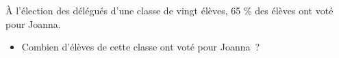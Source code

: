 \documentclass[exercice]{thedocument}%
\begin{document}
%
À l'élection des délégués d'une classe de vingt élèves, 65 \% des élèves
ont voté pour Joanna.
\begin{itemize}
    \item Combien d'élèves de cette classe ont voté pour Joanna~?
\end{itemize}
\end{document}
